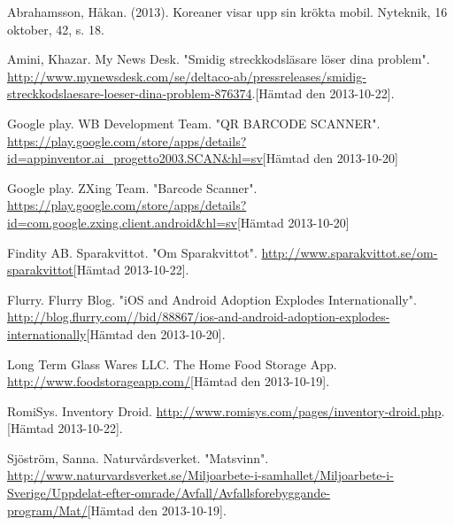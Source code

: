 \documentclass[12pt, a4paper]{article}
\begin{document}
\pagebreak
\begin{thebibliography}{references}

Abrahamsson, Håkan. (2013). 	
Koreaner visar upp sin krökta mobil. Nyteknik, 16 oktober, 42, s. 18.

Amini, Khazar. My News Desk. "Smidig streckkodsläsare löser dina problem". \url{http://www.mynewsdesk.com/se/deltaco-ab/pressreleases/smidig-streckkodslaesare-loeser-dina-problem-876374}.[Hämtad den 2013-10-22].

Google play. WB Development Team. "QR BARCODE SCANNER". \url{https://play.google.com/store/apps/details?id=appinventor.ai_progetto2003.SCAN&hl=sv}[Hämtad den 2013-10-20]

Google play. ZXing Team. "Barcode Scanner". \url{https://play.google.com/store/apps/details?id=com.google.zxing.client.android&hl=sv}[Hämtad 2013-10-20]

Findity AB. Sparakvittot. "Om Sparakvittot". \url{http://www.sparakvittot.se/om-sparakvittot}[Hämtad 2013-10-22].

Flurry. Flurry Blog. "iOS and Android Adoption Explodes Internationally". \url{http://blog.flurry.com//bid/88867/ios-and-android-adoption-explodes-internationally}[Hämtad den 2013-10-20].

Long Term Glass Wares LLC. The Home Food Storage App. \url{http://www.foodstorageapp.com/}[Hämtad den 2013-10-19].

RomiSys. Inventory Droid. \url{http://www.romisys.com/pages/inventory-droid.php}.[Hämtad 2013-10-22].
  
Sjöström, Sanna. Naturvårdsverket. "Matsvinn".
\url{http://www.naturvardsverket.se/Miljoarbete-i-samhallet/Miljoarbete-i-Sverige/Uppdelat-efter-omrade/Avfall/Avfallsforebyggande-program/Mat/}[Hämtad den 2013-10-19].





\end{thebibliography}
\end{document}
